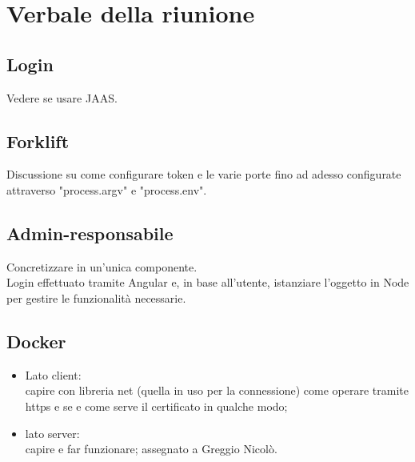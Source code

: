 \section{Verbale della riunione}

\subsection{Login}
Vedere se usare JAAS.

\subsection{Forklift}
Discussione su come configurare token e le varie porte fino ad adesso configurate attraverso "process.argv" e "process.env".

\subsection{Admin-responsabile}
Concretizzare in un'unica componente.\\
Login effettuato tramite Angular e, in base all'utente, istanziare l'oggetto in Node per gestire le funzionalità necessarie.

\subsection{Docker}
\begin{itemize}
	\item Lato client:\\
	capire con libreria net (quella in uso per la connessione) come operare tramite https e se e come serve il certificato in qualche modo;
	\item lato server:\\
	capire e far funzionare; assegnato a Greggio Nicolò.
\end{itemize}